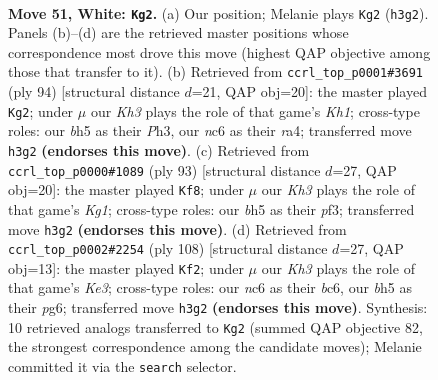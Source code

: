\documentclass[11pt]{article}
\begin{document}
\clearpage

\begin{figure}[p]\centering
\begin{subfigure}{0.46\textwidth}\centering
\resizebox{\linewidth}{!}{%
\newchessgame
\chessboard[
  setfen={4k3/3r4/p1n2P2/7b/1P6/2B4K/P7/2R5 w - - 7 51},
  showmover=false,
  pgfstyle=straightmove, color=movearrow, markmove={h3-g2}
]}
\caption{}
\end{subfigure}\hfill
\begin{subfigure}{0.46\textwidth}\centering
\resizebox{\linewidth}{!}{%
\newchessgame
\chessboard[
  setfen={2B3k1/6p1/Pb6/7p/r7/6PP/3R4/7K w - - 0 48},
  showmover=false,
  pgfstyle=straightmove, color=movearrow, markmove={h1-g2}
]}
\caption{}
\end{subfigure}
\\[4pt]
\begin{subfigure}{0.46\textwidth}\centering
\resizebox{\linewidth}{!}{%
\newchessgame
\chessboard[
  setfen={6k1/4R3/1r4p1/8/8/5PpP/4Nb2/7K b - - 1 47},
  showmover=false,
  pgfstyle=straightmove, color=movearrow, markmove={g8-f8}
]}
\caption{}
\end{subfigure}\hfill
\begin{subfigure}{0.46\textwidth}\centering
\resizebox{\linewidth}{!}{%
\newchessgame
\chessboard[
  setfen={8/5k2/2b3p1/1r4P1/6P1/2B1KP2/8/4R3 w - - 23 55},
  showmover=false,
  pgfstyle=straightmove, color=movearrow, markmove={e3-f2}
]}
\caption{}
\end{subfigure}
\caption{\textbf{Move 51, White: \texttt{Kg2}.} (a) Our position; Melanie plays \texttt{Kg2} (\texttt{h3g2}). Panels (b)--(d) are the retrieved master positions whose correspondence most drove this move (highest QAP objective among those that transfer to it). (b) Retrieved from \texttt{ccrl\_top\_p0001\#3691} (ply 94) [structural distance $d$=21, QAP obj=20]: the master played \texttt{Kg2}; under $\mu$ our \emph{Kh3} plays the role of that game's \emph{Kh1}; cross-type roles: our \emph{b}h5 as their \emph{P}h3, our \emph{n}c6 as their \emph{r}a4; transferred move \texttt{h3g2} \textbf{(endorses this move)}. (c) Retrieved from \texttt{ccrl\_top\_p0000\#1089} (ply 93) [structural distance $d$=27, QAP obj=20]: the master played \texttt{Kf8}; under $\mu$ our \emph{Kh3} plays the role of that game's \emph{Kg1}; cross-type roles: our \emph{b}h5 as their \emph{p}f3; transferred move \texttt{h3g2} \textbf{(endorses this move)}. (d) Retrieved from \texttt{ccrl\_top\_p0002\#2254} (ply 108) [structural distance $d$=27, QAP obj=13]: the master played \texttt{Kf2}; under $\mu$ our \emph{Kh3} plays the role of that game's \emph{Ke3}; cross-type roles: our \emph{n}c6 as their \emph{b}c6, our \emph{b}h5 as their \emph{p}g6; transferred move \texttt{h3g2} \textbf{(endorses this move)}. Synthesis: 10 retrieved analogs transferred to \texttt{Kg2} (summed QAP objective 82, the strongest correspondence among the candidate moves); Melanie committed it via the \texttt{search} selector.}
\label{fig:thought-m100}
\end{figure}
\end{document}
